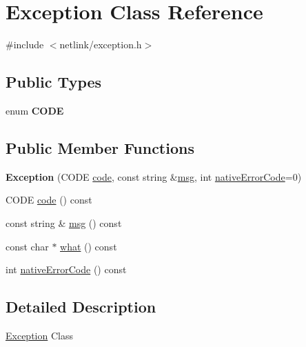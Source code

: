 \hypertarget{classException}{}\section{Exception Class Reference}
\label{classException}


{\ttfamily \#include $<$netlink/exception.\+h$>$}

\subsection*{Public Types}
\begin{DoxyCompactItemize}
\item 
\hypertarget{classException_a99403a9d2a44da7f414a2f3d4f23eca2}{}enum {\bfseries C\+O\+D\+E} \label{classException_a99403a9d2a44da7f414a2f3d4f23eca2}

\end{DoxyCompactItemize}
\subsection*{Public Member Functions}
\begin{DoxyCompactItemize}
\item 
\hypertarget{classException_aafcd1188d8e22205609c25b05d325ae0}{}{\bfseries Exception} (C\+O\+D\+E \hyperlink{classException_a3404e105d108beb97d9fb4b22d9fa04c}{code}, const string \&\hyperlink{classException_ad0b441605d8f410501d91d8e08ed7cfc}{msg}, int \hyperlink{classException_ac63a198ea817835198c53825c5809b3f}{native\+Error\+Code}=0)\label{classException_aafcd1188d8e22205609c25b05d325ae0}

\item 
C\+O\+D\+E \hyperlink{classException_a3404e105d108beb97d9fb4b22d9fa04c}{code} () const 
\item 
const string \& \hyperlink{classException_ad0b441605d8f410501d91d8e08ed7cfc}{msg} () const 
\item 
const char $\ast$ \hyperlink{classException_a45642915395d3b813fedc2593fbcb8bb}{what} () const 
\item 
int \hyperlink{classException_ac63a198ea817835198c53825c5809b3f}{native\+Error\+Code} () const 
\end{DoxyCompactItemize}


\subsection{Detailed Description}
\hyperlink{classException}{Exception} Class 

